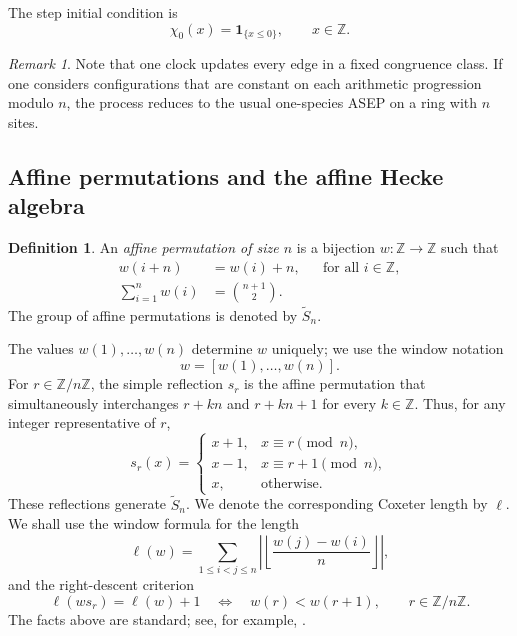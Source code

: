 \documentclass[11pt,a4paper]{amsart}
\theoremstyle{definition}
\newtheorem{definition}[theorem]{Definition}
\theoremstyle{remark}
\newtheorem{remark}[theorem]{Remark}
\numberwithin{equation}{section}
\newcommand{\Z}{\mathbb Z}
\newcommand{\one}{\mathbf 1}
\newcommand{\wtS}{\widetilde S_n}
\newcommand{\floor}[1]{\left\lfloor #1\right\rfloor}
\newcommand{\abs}[1]{\left|#1\right|}
\begin{document}
	The step initial condition is
	\begin{equation}\label{eq:step-initial-condition}
		\chi_0(x)=\one_{\{x\le 0\}},\qquad x\in\Z.
	\end{equation}
	
	\begin{remark}\label{rem:ring-special-case}
		Note that one clock updates every edge in a fixed
		congruence class.  If one considers configurations that are constant on each
		arithmetic progression modulo $n$, the process reduces to the usual
		one-species ASEP on a ring with $n$ sites.
	\end{remark}
	
	\subsection{Affine permutations and the affine Hecke algebra}
	\label{subsec:affine-hecke}
	
	\begin{definition}\label{def:affine-permutation}
		An \emph{affine permutation of size $n$} is a bijection $w:\Z\to\Z$ such
		that
		\begin{align}
			w(i+n)&=w(i)+n, && \mbox{for all $i\in\Z$},\label{eq:affine-periodicity}\\
			\sum_{i=1}^n w(i)&=\binom{n+1}{2}.\label{eq:affine-normalization}
		\end{align}
		The group of affine permutations is denoted by $\wtS$.
	\end{definition}
	
	The values $w(1),\ldots,w(n)$ determine $w$ uniquely; we use the window
	notation
	\[
	w=[w(1),\ldots,w(n)].
	\]
	For $r\in\Z/n\Z$, the simple reflection $s_r$ is the affine permutation that
	simultaneously interchanges $r+kn$ and $r+kn+1$ for every $k\in\Z$.  Thus,
	for any integer representative of $r$,
	\[
	s_r(x)=
	\begin{cases}
		x+1,&x\equiv r\pmod n,\\
		x-1,&x\equiv r+1\pmod n,\\
		x,&\text{otherwise}.
	\end{cases}
	\]
	These reflections generate $\wtS$.  We denote the corresponding Coxeter length by $\ell$.
	We shall use the window formula for the length
	\begin{equation}\label{eq:affine-length-window}
		\ell(w)=
		\sum_{1\le i<j\le n}
		\abs{\floor{\frac{w(j)-w(i)}{n}}},
	\end{equation}
	and the right-descent criterion
	\begin{equation}\label{eq:right-descent-criterion}
		\ell(ws_r)=\ell(w)+1
		\quad\Longleftrightarrow\quad
		w(r)<w(r+1),
		\qquad r\in\Z/n\Z.
	\end{equation}
	The facts above are standard; see, for example,
	\cite{BjornerBrenti}.
	
\end{document}
